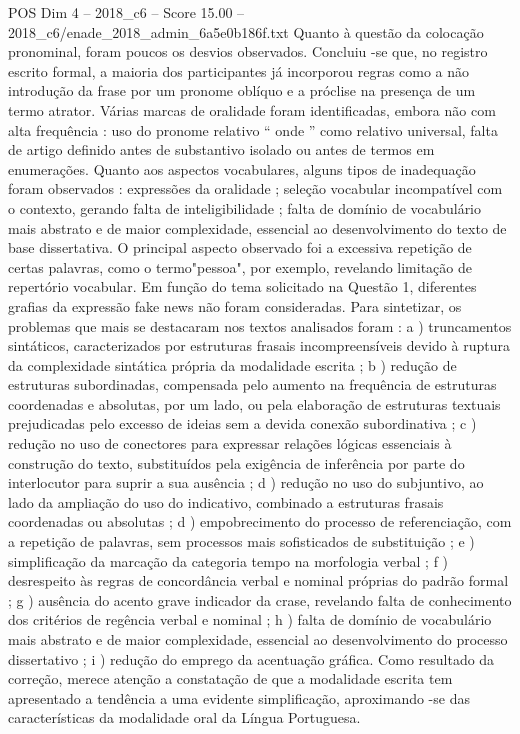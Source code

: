 \begin{textsample}{POS Dim 4 – 2018\_c6 – Score 15.00 – 2018\_c6/enade\_2018\_admin\_6a5e0b186f.txt}
Quanto à questão da colocação pronominal, foram poucos os desvios observados.
Concluiu -se que, no registro escrito formal, a maioria dos participantes já incorporou regras como a não introdução da frase por um pronome oblíquo e a próclise na presença de um termo atrator.
Várias marcas de oralidade foram identificadas, embora não com alta frequência : uso do pronome relativo “ onde ” como relativo universal, falta de artigo definido antes de substantivo isolado ou antes de termos em enumerações.
Quanto aos aspectos vocabulares, alguns tipos de inadequação foram observados : expressões da oralidade ; seleção vocabular incompatível com o contexto, gerando falta de inteligibilidade ; falta de domínio de vocabulário mais abstrato e de maior complexidade, essencial ao desenvolvimento do texto de base dissertativa.
O principal aspecto observado foi a excessiva repetição de certas palavras, como o termo"pessoa", por exemplo, revelando limitação de repertório vocabular.
Em função do tema solicitado na Questão 1, diferentes grafias da expressão fake news não foram consideradas.
Para sintetizar, os problemas que mais se destacaram nos textos analisados foram : a ) truncamentos sintáticos, caracterizados por estruturas frasais incompreensíveis devido à ruptura da complexidade sintática própria da modalidade escrita ; b ) redução de estruturas subordinadas, compensada pelo aumento na frequência de estruturas coordenadas e absolutas, por um lado, ou pela elaboração de estruturas textuais prejudicadas pelo excesso de ideias sem a devida conexão subordinativa ; c ) redução no uso de conectores para expressar relações lógicas essenciais à construção do texto, substituídos pela exigência de inferência por parte do interlocutor para suprir a sua ausência ; d ) redução no uso do subjuntivo, ao lado da ampliação do uso do indicativo, combinado a estruturas frasais coordenadas ou absolutas ; d ) empobrecimento do processo de referenciação, com a repetição de palavras, sem processos mais sofisticados de substituição ; e ) simplificação da marcação da categoria tempo na morfologia verbal ; f ) desrespeito às regras de concordância verbal e nominal próprias do padrão formal ; g ) ausência do acento grave indicador da crase, revelando falta de conhecimento dos critérios de regência verbal e nominal ; h ) falta de domínio de vocabulário mais abstrato e de maior complexidade, essencial ao desenvolvimento do processo dissertativo ; i ) redução do emprego da acentuação gráfica.
Como resultado da correção, merece atenção a constatação de que a modalidade escrita tem apresentado a tendência a uma evidente simplificação, aproximando -se das características da modalidade oral da Língua Portuguesa.

\end{textsample}
